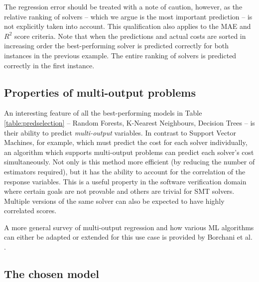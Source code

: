 The regression error should be treated with a note of caution, however, as the relative ranking of solvers -- which we argue is the most important prediction -- is not explicitly taken into account.
This qualification also applies to the MAE and $R^2$ score criteria. 
Note that when the predictions and actual costs are sorted in increasing order the best-performing solver is predicted correctly for both instances in the previous example.
The entire ranking of solvers is predicted correctly in the first instance.

\subsection{Properties of multi-output problems}
\label{sub:multi}

An interesting feature of all the best-performing models in Table \ref{table:predselection} -- Random Forests, K-Nearest Neighbours, Decision Trees -- is their ability to predict \textit{multi-output} variables. 
In contrast to Support Vector Machines, for example, which must predict the cost for each solver individually, an algorithm which supports multi-output problems can predict each solver's cost simultaneously. 
Not only is this method more efficient (by reducing the number of estimators required), but it has the ability to account for the correlation of the response variables. 
This is a useful property in the software verification domain where certain goals are not provable and others are trivial for SMT solvers. 
Multiple versions of the same solver can also be expected to have highly correlated scores.

A more general survey of multi-output regression and how various ML algorithms can either be adapted or extended for this use case is provided by Borchani et al. \cite{multisurvey}.

\subsection{The chosen model}
\label{sec:chosen}


